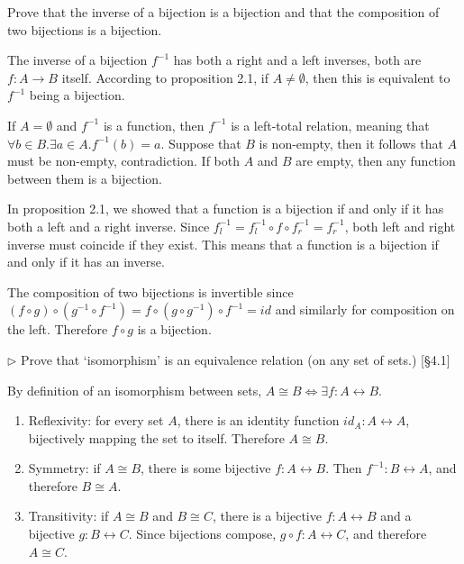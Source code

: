 \begin{problem}
  Prove that the inverse of a bijection is a bijection and that the
  composition of two bijections is a bijection.
\end{problem}
\begin{solution}
  The inverse of a bijection $f^{-1}$ has both a right and a left
  inverses, both are $f : A \to B$ itself. According to proposition 2.1,
  if $A\neq\emptyset$, then this is equivalent to $f^{-1}$ being a bijection.

  If $A=\emptyset$ and $f^{-1}$ is a function, then $f^{-1}$ is a left-total
  relation, meaning that $\forall b \in B. \exists a \in A. f^{-1}(b) = a$.
  Suppose that $B$ is non-empty, then it follows that $A$ must be non-empty,
  contradiction. If both $A$ and $B$ are empty, then any function between them
  is a bijection.

  In proposition 2.1, we showed that a function is a bijection if and only if
  it has both a left and a right inverse. Since $f_l^{-1} =
  f_l^{-1} \circ f \circ f_r^{-1} = f_r^{-1}$, both left and right inverse must
  coincide if they exist. This means that a function is a bijection if and only
  if it has an inverse.

  The composition of two bijections is invertible since $(f \circ g) \circ
  (g^{-1} \circ f^{-1}) = f \circ (g \circ g^{-1}) \circ f^{-1} = id$ and
  similarly for composition on the left. Therefore $f \circ g$ is a bijection.
\end{solution}

\begin{problem}
  $\rhd$ Prove that `isomorphism' is an equivalence relation (on any set
  of sets.) [\S4.1]
\end{problem}
\begin{solution}
  By definition of an isomorphism between sets, $A \cong B \iff \exists f : A \leftrightarrow B$.

  \begin{enumerate}
    \item Reflexivity: for every set $A$, there is an identity function $id_A : A \leftrightarrow A$, bijectively mapping the set to itself. Therefore $A \cong B$.
    \item Symmetry: if $A \cong B$, there is some bijective $f: A \leftrightarrow B$. Then $f^{-1}: B \leftrightarrow A$, and therefore $B \cong A$.
    \item Transitivity: if $A \cong B$ and $B \cong C$, there is a bijective $f: A \leftrightarrow B$ and a bijective $g: B \leftrightarrow C$. Since bijections compose, $g \circ f : A \leftrightarrow C$, and therefore $A \cong C$.
  \end{enumerate}
\end{solution}

